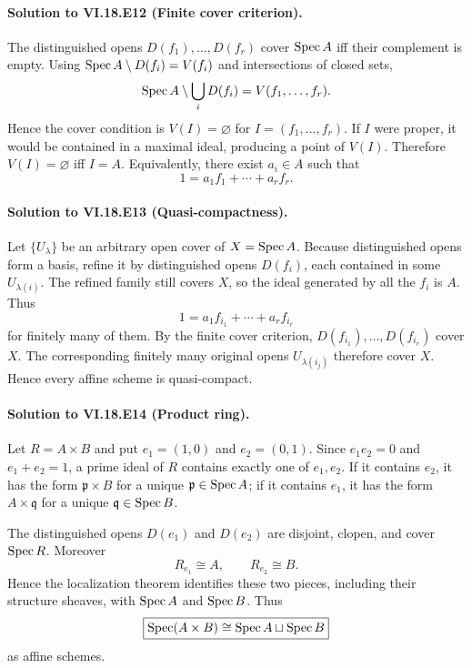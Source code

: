 \paragraph{Solution to VI.18.E12 (Finite cover criterion).}
\begin{solution}
The distinguished opens $D(f_1),\dots,D(f_r)$ cover $\operatorname{Spec} A$ iff their complement is empty. Using $\operatorname{Spec} A\setminus D(f_i)=V(f_i)$ and intersections of closed sets,
\[
\operatorname{Spec} A\setminus\bigcup_iD(f_i)=V(f_1,\dots,f_r).
\]
Hence the cover condition is $V(I)=\varnothing$ for $I=(f_1,\dots,f_r)$. If $I$ were proper, it would be contained in a maximal ideal, producing a point of $V(I)$. Therefore $V(I)=\varnothing$ iff $I=A$. Equivalently, there exist $a_i\in A$ such that
\[
1=a_1f_1+\cdots+a_rf_r.
\]
\end{solution}

\paragraph{Solution to VI.18.E13 (Quasi-compactness).}
\begin{solution}
Let $\{U_\lambda\}$ be an arbitrary open cover of $X=\operatorname{Spec} A$. Because distinguished opens form a basis, refine it by distinguished opens $D(f_i)$, each contained in some $U_{\lambda(i)}$. The refined family still covers $X$, so the ideal generated by all the $f_i$ is $A$. Thus
\[
1=a_1f_{i_1}+\cdots+a_rf_{i_r}
\]
for finitely many of them. By the finite cover criterion, $D(f_{i_1}),\dots,D(f_{i_r})$ cover $X$. The corresponding finitely many original opens $U_{\lambda(i_j)}$ therefore cover $X$. Hence every affine scheme is quasi-compact.
\end{solution}

\paragraph{Solution to VI.18.E14 (Product ring).}
\begin{solution}
Let $R=A\times B$ and put $e_1=(1,0)$ and $e_2=(0,1)$. Since $e_1e_2=0$ and $e_1+e_2=1$, a prime ideal of $R$ contains exactly one of $e_1,e_2$. If it contains $e_2$, it has the form $\mathfrak p\times B$ for a unique $\mathfrak p\in\operatorname{Spec} A$; if it contains $e_1$, it has the form $A\times\mathfrak q$ for a unique $\mathfrak q\in\operatorname{Spec} B$.

The distinguished opens $D(e_1)$ and $D(e_2)$ are disjoint, clopen, and cover $\operatorname{Spec} R$. Moreover
\[
R_{e_1}\cong A,\qquad R_{e_2}\cong B.
\]
Hence the localization theorem identifies these two pieces, including their structure sheaves, with $\operatorname{Spec} A$ and $\operatorname{Spec} B$. Thus
\[
\boxed{\operatorname{Spec}(A\times B)\cong\operatorname{Spec} A\sqcup\operatorname{Spec} B}
\]
as affine schemes.
\end{solution}

